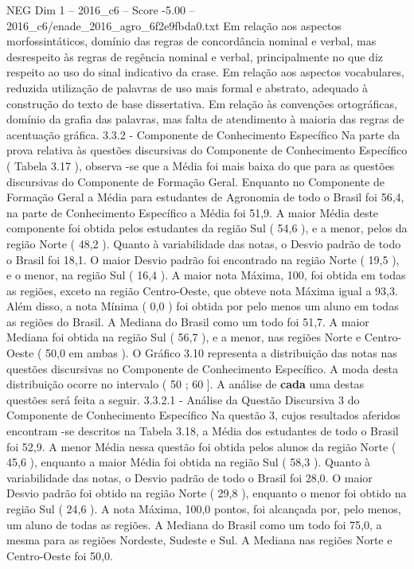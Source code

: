 \begin{textsample}{NEG Dim 1 – 2016\_c6 – Score -5.00 – 2016\_c6/enade\_2016\_agro\_6f2e9fbda0.txt}
Em relação aos aspectos morfossintáticos, domínio das regras de concordância nominal e verbal, mas desrespeito às regras de regência nominal e verbal, principalmente no que diz respeito ao uso do sinal indicativo da crase.
Em relação aos aspectos vocabulares, reduzida utilização de palavras de uso mais formal e abstrato, adequado à construção do texto de base dissertativa.
Em relação às convenções ortográficas, domínio da grafia das palavras, mas falta de atendimento à maioria das regras de acentuação gráfica. 3.3.2 - Componente de Conhecimento Específico Na parte da prova relativa às questões discursivas do Componente de Conhecimento Específico ( Tabela 3.17 ), observa -se que a Média foi mais baixa do que para as questões discursivas do Componente de Formação Geral.
Enquanto no Componente de Formação Geral a Média para estudantes de Agronomia de todo o Brasil foi 56,4, na parte de Conhecimento Específico a Média foi 51,9.
A maior Média deste componente foi obtida pelos estudantes da região Sul ( 54,6 ), e a menor, pelos da região Norte ( 48,2 ).
Quanto à variabilidade das notas, o Desvio padrão de todo o Brasil foi 18,1.
O maior Desvio padrão foi encontrado na região Norte ( 19,5 ), e o menor, na região Sul ( 16,4 ).
A maior nota Máxima, 100, foi obtida em todas as regiões, exceto na região Centro-Oeste, que obteve nota Máxima igual a 93,3.
Além disso, a nota Mínima ( 0,0 ) foi obtida por pelo menos um aluno em todas as regiões do Brasil.
A Mediana do Brasil como um todo foi 51,7.
A maior Mediana foi obtida na região Sul ( 56,7 ), e a menor, nas regiões Norte e Centro-Oeste ( 50,0 em ambas ).
O Gráfico 3.10 representa a distribuição das notas nas questões discursivas no Componente de Conhecimento Específico.
A moda desta distribuição ocorre no intervalo ( 50 ; 60 ].
A análise de \textbf{cada} uma destas questões será feita a seguir. 3.3.2.1 - Análise da Questão Discursiva 3 do Componente de Conhecimento Específico Na questão 3, cujos resultados aferidos encontram -se descritos na Tabela 3.18, a Média dos estudantes de todo o Brasil foi 52,9.
A menor Média nessa questão foi obtida pelos alunos da região Norte ( 45,6 ), enquanto a maior Média foi obtida na região Sul ( 58,3 ).
Quanto à variabilidade das notas, o Desvio padrão de todo o Brasil foi 28,0.
O maior Desvio padrão foi obtido na região Norte ( 29,8 ), enquanto o menor foi obtido na região Sul ( 24,6 ).
A nota Máxima, 100,0 pontos, foi alcançada por, pelo menos, um aluno de todas as regiões.
A Mediana do Brasil como um todo foi 75,0, a mesma para as regiões Nordeste, Sudeste e Sul.
A Mediana nas regiões Norte e Centro-Oeste foi 50,0.

\end{textsample}
